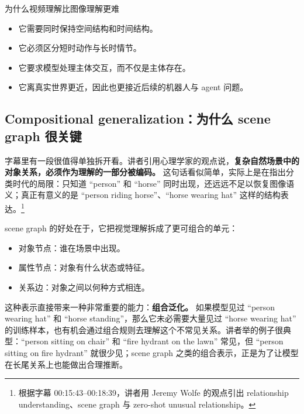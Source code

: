 \documentclass[a4paper]{article}
\begin{document}
\begin{knowledgebox}{为什么视频理解比图像理解更难}
\begin{itemize}
    \item 它需要同时保持空间结构和时间结构。
    \item 它必须区分短时动作与长时情节。
    \item 它要求模型处理主体交互，而不仅是主体存在。
    \item 它离真实世界更近，因此也更接近后续的机器人与 agent 问题。
\end{itemize}
\end{knowledgebox}

\subsection{Compositional generalization：为什么 scene graph 很关键}

字幕里有一段很值得单独拆开看。讲者引用心理学家的观点说，\textbf{复杂自然场景中的对象关系，必须作为理解的一部分被编码。} 这句话看似简单，实际上是在指出分类时代的局限：只知道 ``person'' 和 ``horse'' 同时出现，还远远不足以恢复图像语义；真正有意义的是 ``person riding horse''、``horse wearing hat'' 这样的结构表达。\footnote{根据字幕 00:15:43--00:18:39，讲者用 Jeremy Wolfe 的观点引出 relationship understanding、scene graph 与 zero-shot unusual relationship。}

scene graph 的好处在于，它把视觉理解拆成了更可组合的单元：

\begin{itemize}
    \item 对象节点：谁在场景中出现。
    \item 属性节点：对象有什么状态或特征。
    \item 关系边：对象之间以何种方式相连。
\end{itemize}

这种表示直接带来一种非常重要的能力：\textbf{组合泛化。} 如果模型见过 ``person wearing hat'' 和 ``horse standing''，那么它未必需要大量见过 ``horse wearing hat'' 的训练样本，也有机会通过组合规则去理解这个不常见关系。讲者举的例子很典型：``person sitting on chair'' 和 ``fire hydrant on the lawn'' 常见，但 ``person sitting on fire hydrant'' 就很少见；scene graph 之类的组合表示，正是为了让模型在长尾关系上也能做出合理推断。
\end{document}
